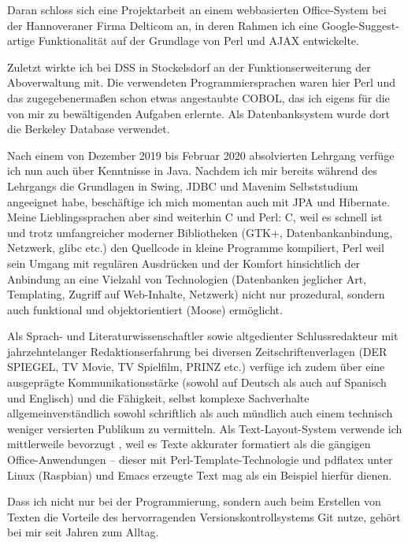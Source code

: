 \documentclass[a4paper,11pt]{dinbrief}
\begin{document}
{\begin{letter}
{{{      Daran schloss sich eine Projektarbeit an einem webbasierten Office-System bei der Hannoveraner Firma
      Delticom an, in deren Rahmen ich eine Google-Suggest-artige Funktionalität auf der Grundlage von Perl und AJAX
      entwickelte.

      Zuletzt wirkte ich bei DSS in Stockelsdorf an der Funktionserweiterung der Aboverwaltung mit. Die
      verwendeten Programmiersprachen waren hier Perl und das zugegebenermaßen schon etwas angestaubte COBOL,
      das ich eigens für die von mir zu bewältigenden Aufgaben erlernte. Als Datenbanksystem wurde dort die
      Berkeley Database verwendet.

      Nach einem von Dezember 2019 bis Februar 2020 absolvierten Lehrgang verfüge ich nun auch über Kenntnisse
      in Java. Nachdem ich mir bereits während des Lehrgangs die Grundlagen in Swing, JDBC und Mavenim Selbststudium
      angeeignet habe, beschäftige ich mich momentan auch mit JPA und Hibernate. Meine Lieblingssprachen aber
      sind weiterhin C und Perl: C, weil es schnell ist und trotz umfangreicher moderner Bibliotheken (GTK+,
      Datenbankanbindung, Netzwerk, glibc etc.) den Quellcode in kleine Programme kompiliert, Perl weil sein
      Umgang mit regulären Ausdrücken und der Komfort hinsichtlich der Anbindung an eine Vielzahl von Technologien
      (Datenbanken jeglicher Art, Templating, Zugriff auf Web-Inhalte, Netzwerk) nicht nur prozedural, sondern
      auch funktional und objektorientiert (Moose) ermöglicht.

      Als Sprach- und Literaturwissenschaftler sowie altgedienter Schlussredakteur mit jahrzehntelanger
      Redaktionserfahrung bei diversen Zeitschriftenverlagen (DER SPIEGEL, TV Movie, TV Spielfilm, PRINZ etc.)
      verfüge ich zudem über eine ausgeprägte Kommunikationsstärke (sowohl auf Deutsch als auch auf Spanisch
      und Englisch) und die Fähigkeit, selbst komplexe Sachverhalte allgemeinverständlich sowohl schriftlich als
      auch mündlich auch einem technisch weniger versierten Publikum zu vermitteln. Als Text-Layout-System
      verwende ich mittlerweile bevorzugt \LaTeXe, weil es Texte akkurater formatiert als die gängigen
      Office-Anwendungen -- dieser mit Perl-Template-Technologie und pdflatex unter Linux (Raspbian) und Emacs
      erzeugte Text mag als ein Beispiel hierfür dienen.

      Dass ich nicht nur bei der Programmierung, sondern auch beim Erstellen von Texten die Vorteile des
      hervorragenden Versionskontrollsystems Git nutze, gehört bei mir seit Jahren zum Alltag.
      
}}}
\end{letter}}
\end{document}
